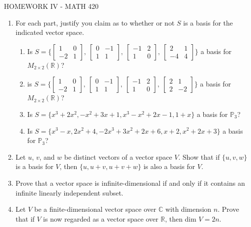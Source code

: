\documentclass{article}
\begin{document}
\centerline{HOMEWORK IV - MATH 420}
\begin{enumerate}
\item
For each part, justify you claim as to whether or not $S$ is a basis for the indicated vector space.
\begin{enumerate}
\item  Is $S=\{\left[\begin{array}{cc}
1&0\\-2&1\end{array}\right],\ \left[\begin{array}{cc}
0&-1\\1&1\end{array}\right], \ \left[ \begin{array}{cc}
-1&2\\1&0\end{array}\right]
, \ \left[ \begin{array}{cc}
2&1\\-4&4\end{array}\right]\}$ a basis for $M_{2\times 2}(\mathbb{R})$?
\item is $S=\{\left[\begin{array}{cc}
1&0\\-2&1\end{array}\right],\ \left[\begin{array}{cc}
0&-1\\1&1\end{array}\right], \ \left[ \begin{array}{cc}
-1&2\\1&0\end{array}\right]
, \ \left[ \begin{array}{cc}
2&1\\2&-2\end{array}\right]\}$  a basis for $M_{2\times 2}(\mathbb{R})$?
\item Is $S=\{x^3+2x^2, -x^2+3x+1,x^3-x^2+2x-1, 1+x\}$ a basis for $\mathbb{P}_3$?
\item Is $S=\{x^3-x, 2x^2+4,-2x^3+3x^2+2x+6,x+2,x^2+2x+3\}$  a basis for $\mathbb{P}_3$?
\end{enumerate}

\item Let $u$, $v$, and $w$ be distinct vectors of a vector space $V$. Show that if $\{u, v, w\}$ is a basis for $V$, then $\{u, u+v,u+v+w\}$ is also a basis for $V$.

\item Prove that a vector space is infinite-dimensional if and only if it contains an infinite linearly independent subset.
    
 \item Let $V$ be a finite-dimensional vector space over $\mathbb{C}$ with dimension $n$. Prove that if $V$ is now regarded as a vector space over $\mathbb{R}$, then dim $V=2n$.


     \end{enumerate}
     
\end{document}
